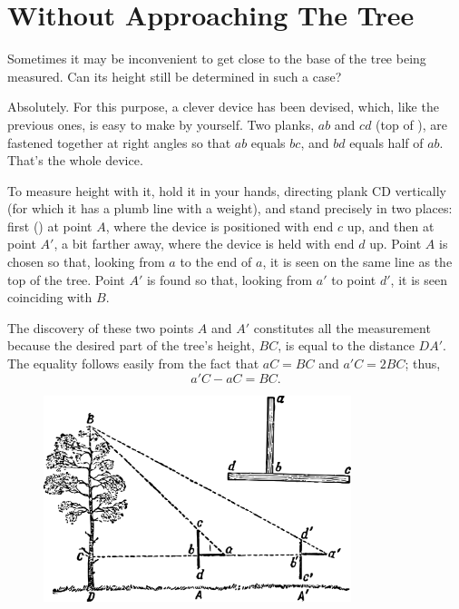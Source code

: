 \section{Without Approaching The Tree}
\label{sec-1.6}

Sometimes it may be inconvenient to get close to the base of the tree being measured. Can its height still be determined in such a case?

Absolutely. For this purpose, a clever device has been devised, which, like the previous ones, is easy to make by yourself. Two planks, $ab$ and $cd$ (top of ), are fastened together at right angles so that $ab$ equals $bc$, and $bd$ equals half of $ab$. That's the whole device. 

To measure height with it, hold it in your hands, directing plank CD vertically (for which it has a plumb line with a weight), and stand precisely in two places: first () at point $A$, where the device is positioned with end $c$ up, and then at point $A'$, a bit farther away, where the device is held with end $d$ up. Point $A$ is chosen so that, looking from $a$ to the end of $a$, it is seen on the same line as the top of the tree. Point $A'$ is found so that, looking from $a'$ to point $d'$, it is seen coinciding with $B$. 

The discovery of these two points $A$ and $A'$ constitutes all the measurement because the desired part of the tree's height, $BC$, is equal to the distance $DA'$. The equality follows easily from the fact that $aC = BC$ and $a'C = 2BC$; thus,
\begin{equation*}%
a'C - aC = BC.
\end{equation*}


\begin{figure}[h!]
\centering
\includegraphics[width=0.8\textwidth]{figures/ch-01/fig-01-10.pdf}
\end{figure}




